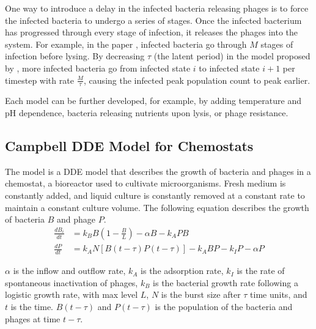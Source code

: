 One way to introduce a delay in the infected bacteria releasing phages is to force the infected bacteria to undergo a series of stages. 
Once the infected bacterium has progressed through every stage of infection, it releases the phages into the system. 
For example, in the paper \citet{gengUsingBacterialPopulation2024}, infected bacteria go through $M$ stages of infection before lysing. 
By decreasing $\tau$ (the latent period) in the model proposed by \citet{gengUsingBacterialPopulation2024}, more infected bacteria go from infected state $i$ to infected state $i+1$ per timestep with rate $\frac{M}{\tau}$, causing the infected peak population count to peak earlier. 
 
Each model can be further developed, for example, by adding temperature and pH dependence, bacteria releasing nutrients upon lysis, or phage resistance. 

\subsection{Campbell DDE Model for Chemostats}
The \citet{campbellConditionsExistenceBacteriophage1961} model is a DDE model that describes the growth of bacteria and phages in a chemostat, a bioreactor used to cultivate microorganisms. 
Fresh medium is constantly added, and liquid culture is constantly removed at a constant rate to maintain a constant culture volume. 
The following equation describes the growth of bacteria $B$ and phage $P$. 
\begin{align*}
    \frac{d{B}_i}{dt} &= k_B B \left (1 - \frac{B}{L}\right ) -\alpha B - k_A PB \\
    \frac{dP}{dt} &= k_A N \left [B(t-\tau)P(t-\tau) \right ] - k_A BP - k_IP-\alpha P
\end{align*}

$\alpha$ is the inflow and outflow rate, $k_A$ is the adsorption rate, $k_I$ is the rate of spontaneous inactivation of phages, $k_B$ is the bacterial growth rate following a logistic growth rate, with max level $L$, $N$ is the burst size after $\tau$ time units, and $t$ is the time. 
$B(t-\tau)$ and $P(t-\tau)$ is the population of the bacteria and phages at time $t-\tau$. 


